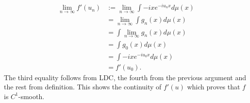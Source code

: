 \documentclass[12pt]{amsart} %
\begin{document}
 \begin{align*}
	 \lim_{n \to \infty} f'(u_n) &:= \lim_{n \to \infty} \int -ixe^{-iu_nx} d\mu(x) \\
          &= \lim_{n \to \infty} \int g_n(x) d\mu(x) \\
	  &= \int \lim_{n \to \infty} g_n(x) d\mu(x) \\
	  &= \int g_0(x) d\mu(x) \\
	  &= \int -ixe^{-iu_0x}d\mu(x) \\ 
	  &= f'(u_0).
 \end{align*}
 The third equality follows from LDC, the fourth from the previous argument and the rest from definition. This shows the continuity of $f'(u)$ which proves that  $f$ is  $C^1$-smooth.  


\vfill

 
\end{document}
